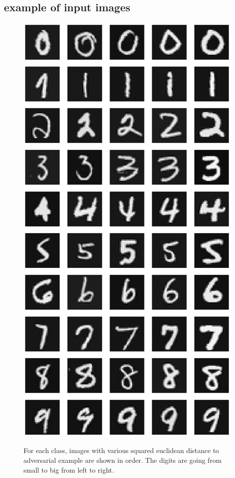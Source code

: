 \documentclass{article} %
\begin{document}
\null
\vfill
\raggedbottom
\pagebreak
\newpage


\subsection{example of input images}

\begin{figure}[h!]
\begin{center}
\includegraphics[scale=0.5]{figs/sup_5}
\label{exp:sup_5}
\caption{\small For each class, images with various squared
euclidean distance to adversarial example are shown in order. The digits are going from small to big from left to right.}
\end{center}
\end{figure}

\null
\vfill
\raggedbottom
\pagebreak
\newpage
\end{document}
